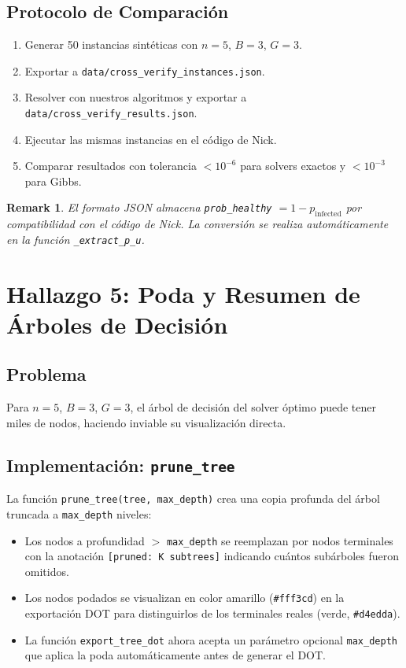 \documentclass[11pt, a4paper]{article}
\newtheorem{remark}{Remark}
\begin{document}
\subsection{Protocolo de Comparaci\'on}
\begin{enumerate}[nosep]
    \item Generar 50 instancias sint\'eticas con $n=5$, $B=3$, $G=3$.
    \item Exportar a \texttt{data/cross\_verify\_instances.json}.
    \item Resolver con nuestros algoritmos y exportar a
    \texttt{data/cross\_verify\_results.json}.
    \item Ejecutar las mismas instancias en el c\'odigo de Nick.
    \item Comparar resultados con tolerancia $< 10^{-6}$ para solvers
    exactos y $< 10^{-3}$ para Gibbs.
\end{enumerate}

\begin{remark}
El formato JSON almacena \texttt{prob\_healthy} $= 1 - p_{\text{infected}}$
por compatibilidad con el c\'odigo de Nick. La conversi\'on se realiza
autom\'aticamente en la funci\'on \texttt{\_extract\_p\_u}.
\end{remark}

\section{Hallazgo 5: Poda y Resumen de \'Arboles de Decisi\'on}

\subsection{Problema}
Para $n = 5$, $B = 3$, $G = 3$, el \'arbol de decisi\'on del solver
\'optimo puede tener miles de nodos, haciendo inviable su visualizaci\'on
directa.

\subsection{Implementaci\'on: \texttt{prune\_tree}}
La funci\'on \texttt{prune\_tree(tree, max\_depth)} crea una copia
profunda del \'arbol truncada a \texttt{max\_depth} niveles:

\begin{itemize}[nosep]
    \item Los nodos a profundidad $>$ \texttt{max\_depth} se reemplazan
    por nodos terminales con la anotaci\'on
    \texttt{[pruned: K subtrees]} indicando cu\'antos sub\'arboles
    fueron omitidos.
    \item Los nodos podados se visualizan en color amarillo (\texttt{\#fff3cd})
    en la exportaci\'on DOT para distinguirlos de los terminales reales
    (verde, \texttt{\#d4edda}).
    \item La funci\'on \texttt{export\_tree\_dot} ahora acepta un
    par\'ametro opcional \texttt{max\_depth} que aplica la poda
    autom\'aticamente antes de generar el DOT.
\end{itemize}
\end{document}
